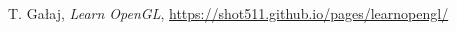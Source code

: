 \documentclass[a4paper,12pt]{article}
\numberwithin{equation}{section}
\begin{document}


\begin{thebibliography}{9}
     T. Gałaj, \emph{Learn OpenGL}, \href{https://shot511.github.io/pages/learnopengl/}{https://shot511.github.io/pages/learnopengl/}
\end{thebibliography}
\end{document}

